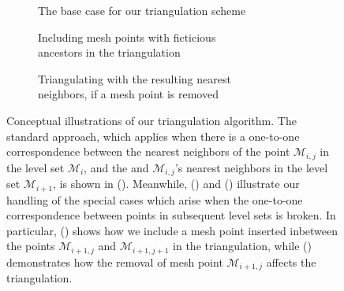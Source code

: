 \begin{figure}[htpb]
    \centering
    \begin{subfigure}[b]{0.55\textwidth}
        \centering
        \resizebox{0.9\linewidth}{!}%
        {}
        \caption[]{{\small The base case for our triangulation scheme}}
        \label{fig:triangulation_basecase}
    \end{subfigure}

    \begin{subfigure}[b]{0.475\textwidth}
        \centering
        \resizebox{0.9\linewidth}{!}%
        {}
        \caption[]{{\small Including mesh points with ficticious
        \\\phantom{(b)} ancestors in the triangulation}}
        \label{fig:triangulation_pointinserted}
    \end{subfigure}
    \begin{subfigure}[b]{0.475\textwidth}
        \centering
        \resizebox{0.9\linewidth}{!}%
        {}
        \caption[]{{\small Triangulating with the resulting nearest
        \\\phantom{(c)} neighbors, if a mesh point is removed}}
        \label{fig:triangulation_pointremoved}
    \end{subfigure}
    \caption[Conceptual illustrations of our triangulation algorithm]
    {Conceptual illustrations of our triangulation algorithm. The standard
        approach, which applies when there is a one-to-one correspondence
        between the nearest neighbors of the point $\mathcal{M}_{i,j}$ in the
        level set $\mathcal{M}_{i}$, and the and $\mathcal{M}_{i,j}$'s nearest
        neighbors in the level set $\mathcal{M}_{i+1}$, is shown in
        (). Meanwhile,
        () and
        () illustrate our handling of
        the special cases which arise when the one-to-one correspondence
        between points in subsequent level sets is broken. In particular,
        () shows how we include
        a mesh point inserted inbetween the points $\mathcal{M}_{i+1,j}$
        and $\mathcal{M}_{i+1,j+1}$ in the triangulation, while
        () demonstrates how the removal
        of mesh point $\mathcal{M}_{i+1,j}$ affects the triangulation.
}
\end{figure}
